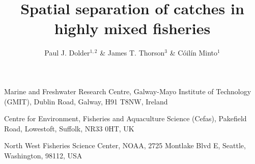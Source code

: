 \documentclass{nature}
\title{Spatial separation of catches in highly mixed fisheries}
\author{Paul J. Dolder$^{1,2}$ \& James T. Thorson$^3$ \& Cóilín Minto$^1$}
\begin{document}
\maketitle

\begin{affiliations}
\item Marine and Freshwater Research Centre, Galway-Mayo Institute of
	Technology (GMIT), Dublin Road, Galway, H91 T8NW, Ireland 
\item Centre for Environment, Fisheries and Aquaculture Science (Cefas),
	Pakefield Road, Lowestoft, Suffolk, NR33 0HT, UK
\item North West Fisheries Science Center, NOAA, 2725 Montlake Blvd E, Seattle,
	Washington, 98112, USA
\end{affiliations}

\end{document}
